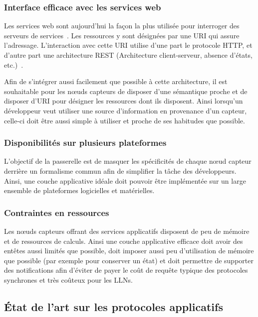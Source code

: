 \subsubsection{Interface efficace avec les services web}

Les services web sont aujourd'hui la façon la plus utilisée pour interroger des serveurs de services~\cite{alonso2004web}.
Les ressources y sont désignées par une \ac{URI} qui assure l'adressage.
L'interaction avec cette \ac{URI} utilise d'une part le protocole \ac{HTTP}, et d'autre part une architecture \ac{REST} (Architecture client-serveur, absence d'états, etc.)~\cite{richardson2008restful}.

Afin de s'intégrer aussi facilement que possible à cette architecture, il est souhaitable pour les nœuds capteurs de disposer d'une sémantique proche et de disposer d'\ac{URI} pour désigner les ressources dont ils disposent.
Ainsi lorsqu'un développeur veut utiliser une source d'information en provenance d'un capteur, celle-ci doit être aussi simple à utiliser et proche de ses habitudes que possible.

\subsubsection{Disponibilités sur plusieurs plateformes}

L'objectif de la passerelle est de masquer les spécificités de chaque nœud capteur derrière un formalisme commun afin de simplifier la tâche des développeurs.
Ainsi, une couche applicative idéale doit pouvoir être implémentée sur un large ensemble de plateformes logicielles et matérielles.

\subsubsection{Contraintes en ressources}

Les nœuds capteurs offrant des services applicatifs disposent de peu de mémoire et de ressources de calculs.
Ainsi une couche applicative efficace doit avoir des entêtes aussi limités que possible, doit imposer aussi peu d'utilisation de mémoire que possible (par exemple pour conserver un état) et doit permettre de supporter des notifications afin d'éviter de payer le coût de requête typique des protocoles synchrones et très coûteux pour les \ac{LLN}s.

\subsection{État de l'art sur les protocoles applicatifs}

